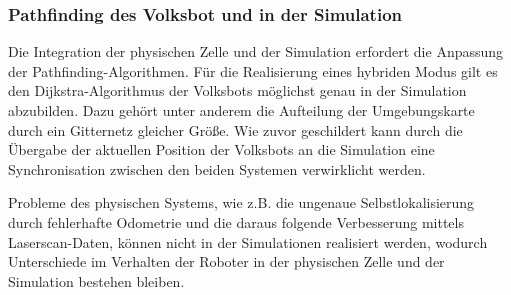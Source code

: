 \subsubsection{Pathfinding des Volksbot und in der Simulation}

Die Integration der physischen Zelle und der Simulation erfordert die Anpassung der Pathfinding-Algorithmen. Für die Realisierung eines hybriden Modus gilt es den Dijkstra-Algorithmus der Volksbots möglichst genau in der Simulation abzubilden. Dazu gehört unter anderem die Aufteilung der Umgebungskarte durch ein Gitternetz gleicher Größe. Wie zuvor geschildert kann durch die Übergabe der aktuellen Position der Volksbots an die Simulation eine Synchronisation zwischen den beiden Systemen verwirklicht werden.

Probleme des physischen Systems, wie z.B. die ungenaue Selbstlokalisierung durch fehlerhafte Odometrie und die daraus folgende Verbesserung mittels Laserscan-Daten, können nicht in der Simulationen realisiert werden, wodurch Unterschiede im Verhalten der Roboter in der physischen Zelle und der Simulation bestehen bleiben. 
